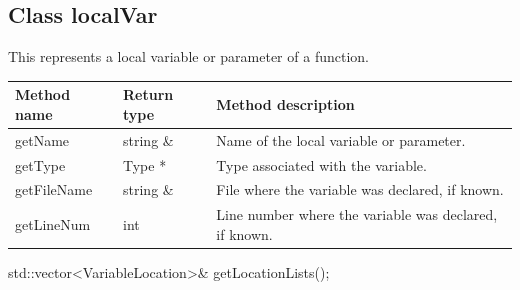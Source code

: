 \subsection{Class localVar}\label{localVar}


This represents a local variable or parameter of a function.


\begin{tabularx}{\textwidth}{llX}
\toprule
Method name & Return type & Method description \\
\midrule
getName & string \& & Name of the local variable or parameter. \\
getType & Type * & Type associated with the variable. \\
getFileName & string \& & File where the variable was declared, if known. \\
getLineNum & int & Line number where the variable was declared, if known. \\
\bottomrule
\end{tabularx}

\begin{apient}
std::vector<VariableLocation>& getLocationLists();
\end{apient}
